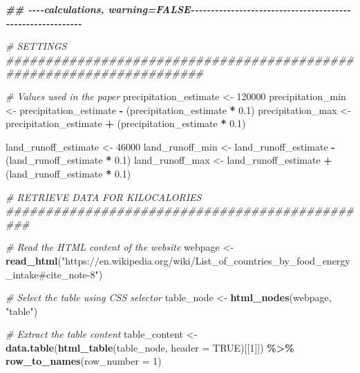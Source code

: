 \documentclass[
  11pt,
]{article}
\newenvironment{Shaded}{\begin{snugshade}}{\end{snugshade}}
\newcommand{\AttributeTok}[1]{\textcolor[rgb]{0.13,0.29,0.53}{#1}}
\newcommand{\CommentTok}[1]{\textcolor[rgb]{0.56,0.35,0.01}{\textit{#1}}}
\newcommand{\ConstantTok}[1]{\textcolor[rgb]{0.56,0.35,0.01}{#1}}
\newcommand{\DecValTok}[1]{\textcolor[rgb]{0.00,0.00,0.81}{#1}}
\newcommand{\DocumentationTok}[1]{\textcolor[rgb]{0.56,0.35,0.01}{\textbf{\textit{#1}}}}
\newcommand{\FloatTok}[1]{\textcolor[rgb]{0.00,0.00,0.81}{#1}}
\newcommand{\FunctionTok}[1]{\textcolor[rgb]{0.13,0.29,0.53}{\textbf{#1}}}
\newcommand{\NormalTok}[1]{#1}
\newcommand{\OtherTok}[1]{\textcolor[rgb]{0.56,0.35,0.01}{#1}}
\newcommand{\SpecialCharTok}[1]{\textcolor[rgb]{0.81,0.36,0.00}{\textbf{#1}}}
\newcommand{\StringTok}[1]{\textcolor[rgb]{0.31,0.60,0.02}{#1}}
\begin{document}
\begin{Shaded}
\begin{Highlighting}[]
\DocumentationTok{\#\# {-}{-}{-}{-}calculations, warning=FALSE{-}{-}{-}{-}{-}{-}{-}{-}{-}{-}{-}{-}{-}{-}{-}{-}{-}{-}{-}{-}{-}{-}{-}{-}{-}{-}{-}{-}{-}{-}{-}{-}{-}{-}{-}{-}{-}{-}{-}{-}{-}{-}{-}{-}{-}{-}{-}{-}{-}{-}{-}{-}{-}{-}{-}{-}{-}{-}{-}}

\CommentTok{\# SETTINGS \#\#\#\#\#\#\#\#\#\#\#\#\#\#\#\#\#\#\#\#\#\#\#\#\#\#\#\#\#\#\#\#\#\#\#\#\#\#\#\#\#\#\#\#\#\#\#\#\#\#\#\#\#\#\#\#\#\#\#\#\#\#\#\#\#\#\#\#\#}

\CommentTok{\# Values used in the paper}
\NormalTok{precipitation\_estimate }\OtherTok{\textless{}{-}} \DecValTok{120000}
\NormalTok{precipitation\_min }\OtherTok{\textless{}{-}}\NormalTok{ precipitation\_estimate }\SpecialCharTok{{-}}\NormalTok{ (precipitation\_estimate }\SpecialCharTok{*} \FloatTok{0.1}\NormalTok{)}
\NormalTok{precipitation\_max }\OtherTok{\textless{}{-}}\NormalTok{ precipitation\_estimate }\SpecialCharTok{+}\NormalTok{ (precipitation\_estimate }\SpecialCharTok{*} \FloatTok{0.1}\NormalTok{)}

\NormalTok{land\_runoff\_estimate }\OtherTok{\textless{}{-}} \DecValTok{46000}
\NormalTok{land\_runoff\_min }\OtherTok{\textless{}{-}}\NormalTok{ land\_runoff\_estimate }\SpecialCharTok{{-}}\NormalTok{ (land\_runoff\_estimate  }\SpecialCharTok{*} \FloatTok{0.1}\NormalTok{)}
\NormalTok{land\_runoff\_max }\OtherTok{\textless{}{-}}\NormalTok{ land\_runoff\_estimate }\SpecialCharTok{+}\NormalTok{ (land\_runoff\_estimate  }\SpecialCharTok{*} \FloatTok{0.1}\NormalTok{)}

\CommentTok{\# RETRIEVE DATA FOR KILOCALORIES \#\#\#\#\#\#\#\#\#\#\#\#\#\#\#\#\#\#\#\#\#\#\#\#\#\#\#\#\#\#\#\#\#\#\#\#\#\#\#\#\#\#\#\#\#\#\#}

\CommentTok{\# Read the HTML content of the website }
\NormalTok{webpage }\OtherTok{\textless{}{-}} \FunctionTok{read\_html}\NormalTok{(}\StringTok{"https://en.wikipedia.org/wiki/List\_of\_countries\_by\_food\_energy\_intake\#cite\_note{-}8"}\NormalTok{) }

\CommentTok{\# Select the table using CSS selector }
\NormalTok{table\_node }\OtherTok{\textless{}{-}} \FunctionTok{html\_nodes}\NormalTok{(webpage, }\StringTok{"table"}\NormalTok{) }

\CommentTok{\# Extract the table content }
\NormalTok{table\_content }\OtherTok{\textless{}{-}} \FunctionTok{data.table}\NormalTok{(}\FunctionTok{html\_table}\NormalTok{(table\_node, }\AttributeTok{header =} \ConstantTok{TRUE}\NormalTok{)[[}\DecValTok{1}\NormalTok{]]) }\SpecialCharTok{\%\textgreater{}\%}
  \FunctionTok{row\_to\_names}\NormalTok{(}\AttributeTok{row\_number =} \DecValTok{1}\NormalTok{)}


\end{Highlighting}
\end{Shaded}
\end{document}
